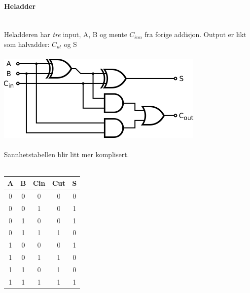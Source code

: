 \paragraph{Heladder} \mbox{} \\
Heladderen har \emph{tre} input, A, B og mente $C_{inn}$ fra forige addisjon.
Output er likt som halvadder: $C_{ut}$ og S
\\\\
\includegraphics[width=\textwidth]{./img/full-adder}
\\\\
Sannhetstabellen blir litt mer komplisert.
\\\\
\begin{tabular}{c|c|c|c|c}
  A & B & Cin & Cut & S \\ \hline
  0 & 0 & 0 & 0 & 0 \\
  0 & 0 & 1 & 0 & 1 \\
  0 & 1 & 0 & 0 & 1 \\
  0 & 1 & 1 & 1 & 0 \\
  1 & 0 & 0 & 0 & 1 \\
  1 & 0 & 1 & 1 & 0 \\
  1 & 1 & 0 & 1 & 0 \\
  1 & 1 & 1 & 1 & 1
\end{tabular}




